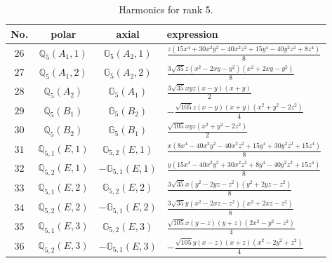 \documentclass[fleqn,8pt,landscape]{jsarticle}
\begin{document}
\begin{table}[ht!]
\begin{center}
\caption{Harmonics for rank 5.}
\renewcommand{\arraystretch}{1.3}
\begin{tabular}{cccl} \hline \hline
No. & polar & axial & expression \\ \hline
$ 26 $ & $ \mathbb{Q}_{5}(A_{1},1) $ & $ \mathbb{G}_{5}(A_{2},1) $ & $ \frac{z \left(15 x^{4} + 30 x^{2} y^{2} - 40 x^{2} z^{2} + 15 y^{4} - 40 y^{2} z^{2} + 8 z^{4}\right)}{8} $ \\
$ 27 $ & $ \mathbb{Q}_{5}(A_{1},2) $ & $ \mathbb{G}_{5}(A_{2},2) $ & $ \frac{3 \sqrt{35} z \left(x^{2} - 2 x y - y^{2}\right) \left(x^{2} + 2 x y - y^{2}\right)}{8} $ \\
$ 28 $ & $ \mathbb{Q}_{5}(A_{2}) $ & $ \mathbb{G}_{5}(A_{1}) $ & $ \frac{3 \sqrt{35} x y z \left(x - y\right) \left(x + y\right)}{2} $ \\
$ 29 $ & $ \mathbb{Q}_{5}(B_{1}) $ & $ \mathbb{G}_{5}(B_{2}) $ & $ - \frac{\sqrt{105} z \left(x - y\right) \left(x + y\right) \left(x^{2} + y^{2} - 2 z^{2}\right)}{4} $ \\
$ 30 $ & $ \mathbb{Q}_{5}(B_{2}) $ & $ \mathbb{G}_{5}(B_{1}) $ & $ \frac{\sqrt{105} x y z \left(x^{2} + y^{2} - 2 z^{2}\right)}{2} $ \\
$ 31 $ & $ \mathbb{Q}_{5,1}(E,1) $ & $ \mathbb{G}_{5,2}(E,1) $ & $ \frac{x \left(8 x^{4} - 40 x^{2} y^{2} - 40 x^{2} z^{2} + 15 y^{4} + 30 y^{2} z^{2} + 15 z^{4}\right)}{8} $ \\
$ 32 $ & $ \mathbb{Q}_{5,2}(E,1) $ & $ -\mathbb{G}_{5,1}(E,1) $ & $ \frac{y \left(15 x^{4} - 40 x^{2} y^{2} + 30 x^{2} z^{2} + 8 y^{4} - 40 y^{2} z^{2} + 15 z^{4}\right)}{8} $ \\
$ 33 $ & $ \mathbb{Q}_{5,1}(E,2) $ & $ \mathbb{G}_{5,2}(E,2) $ & $ \frac{3 \sqrt{35} x \left(y^{2} - 2 y z - z^{2}\right) \left(y^{2} + 2 y z - z^{2}\right)}{8} $ \\
$ 34 $ & $ \mathbb{Q}_{5,2}(E,2) $ & $ -\mathbb{G}_{5,1}(E,2) $ & $ \frac{3 \sqrt{35} y \left(x^{2} - 2 x z - z^{2}\right) \left(x^{2} + 2 x z - z^{2}\right)}{8} $ \\
$ 35 $ & $ \mathbb{Q}_{5,1}(E,3) $ & $ \mathbb{G}_{5,2}(E,3) $ & $ \frac{\sqrt{105} x \left(y - z\right) \left(y + z\right) \left(2 x^{2} - y^{2} - z^{2}\right)}{4} $ \\
$ 36 $ & $ \mathbb{Q}_{5,2}(E,3) $ & $ -\mathbb{G}_{5,1}(E,3) $ & $ - \frac{\sqrt{105} y \left(x - z\right) \left(x + z\right) \left(x^{2} - 2 y^{2} + z^{2}\right)}{4} $ \\
 \hline \hline
\end{tabular}
\end{center}
\end{table}
\end{document}
